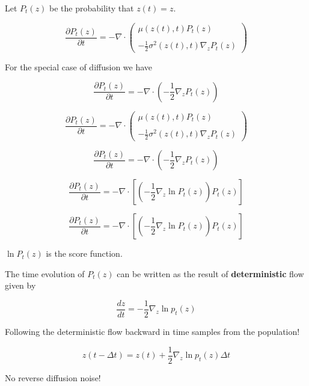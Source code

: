 {

Let $P_t(z)$ be the probability that $z(t) = z$.

$$\frac{\partial P_t(z)}{\partial t} = - \nabla \cdot\left(\begin{array}{l}\mu(z(t),t)P_t(z) \\ \\ - \frac{1}{2}\sigma^2(z(t),t) \nabla_z P_t(z)\end{array}\right)$$

\vfill
For the special case of diffusion we have

$$\frac{\partial P_t(z)}{\partial t} = - \nabla \cdot\left(-\frac{1}{2}\nabla_z P_t(z)\right)$$

$$\frac{\partial P_t(z)}{\partial t} = - \nabla \cdot\left(\begin{array}{l}\mu(z(t),t)P_t(z) \\ \\ - \frac{1}{2}\sigma^2(z(t),t) \nabla_z P_t(z)\end{array}\right)$$

\vfill
$$\frac{\partial P_t(z)}{\partial t} = - \nabla \cdot\left(-\frac{1}{2}\nabla_z P_t(z)\right)$$

\vfill
$$\frac{\partial P_t(z)}{\partial t} = - \nabla \cdot\left[\left(-\frac{1}{2}\nabla_z \ln P_t(z)\right)P_t(z)\right]$$


$$\frac{\partial P_t(z)}{\partial t} = - \nabla \cdot\left[\left(-\frac{1}{2}\nabla_z \ln P_t(z)\right)P_t(z)\right]$$

\vfill
$\ln P_t(z)$ is the score function.

\vfill
The time evolution of $P_t(z)$ can be written as the result of {\bf deterministic} flow given by

$$\frac{dz}{dt} = - \frac{1}{2}\nabla_z \ln p_t(z)$$


Following the deterministic flow backward in time samples from the population!

$$z(t-\Delta t) = z(t) + \frac{1}{2} \nabla_z \ln p_t(z) \Delta t$$

\vfill
No reverse diffusion noise!

}
